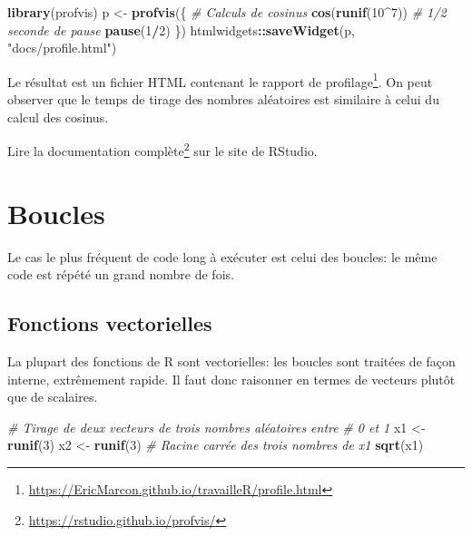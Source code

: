 \documentclass[
  12pt,
  french,
  a4paper,
  extrafontsizes,onecolumn,openright
  ]{memoir}
\newenvironment{Shaded}{\begin{snugshade}}{\end{snugshade}}
\newcommand{\CommentTok}[1]{\textcolor[rgb]{0.56,0.35,0.01}{\textit{#1}}}
\newcommand{\DecValTok}[1]{\textcolor[rgb]{0.00,0.00,0.81}{#1}}
\newcommand{\KeywordTok}[1]{\textcolor[rgb]{0.13,0.29,0.53}{\textbf{#1}}}
\newcommand{\NormalTok}[1]{#1}
\newcommand{\OperatorTok}[1]{\textcolor[rgb]{0.81,0.36,0.00}{\textbf{#1}}}
\newcommand{\StringTok}[1]{\textcolor[rgb]{0.31,0.60,0.02}{#1}}
\begin{document}
\scriptsize

\begin{Shaded}
\begin{Highlighting}[]
\KeywordTok{library}\NormalTok{(profvis)}
\NormalTok{p <-}\StringTok{ }\KeywordTok{profvis}\NormalTok{(\{}
    \CommentTok{# Calculs de cosinus}
    \KeywordTok{cos}\NormalTok{(}\KeywordTok{runif}\NormalTok{(}\DecValTok{10}\OperatorTok{^}\DecValTok{7}\NormalTok{))}
    \CommentTok{# 1/2 seconde de pause}
    \KeywordTok{pause}\NormalTok{(}\DecValTok{1}\OperatorTok{/}\DecValTok{2}\NormalTok{)}
\NormalTok{\})}
\NormalTok{htmlwidgets}\OperatorTok{::}\KeywordTok{saveWidget}\NormalTok{(p, }\StringTok{"docs/profile.html"}\NormalTok{)}
\end{Highlighting}
\end{Shaded}

\normalsize

Le résultat est un fichier HTML contenant le rapport de profilage\footnote{\url{https://EricMarcon.github.io/travailleR/profile.html}}.
On peut observer que le temps de tirage des nombres aléatoires est similaire à celui du calcul des cosinus.

Lire la documentation complète\footnote{\url{https://rstudio.github.io/profvis/}} sur le site de RStudio.

\hypertarget{boucles}{%
\section{Boucles}\label{boucles}}

Le cas le plus fréquent de code long à exécuter est celui des boucles: le même code est répété un grand nombre de fois.

\hypertarget{fonctions-vectorielles}{%
\subsection{Fonctions vectorielles}\label{fonctions-vectorielles}}

La plupart des fonctions de R sont vectorielles: les boucles sont traitées de façon interne, extrêmement rapide.
Il faut donc raisonner en termes de vecteurs plutôt que de scalaires.

\scriptsize

\begin{Shaded}
\begin{Highlighting}[]
\CommentTok{# Tirage de deux vecteurs de trois nombres aléatoires entre}
\CommentTok{# 0 et 1}
\NormalTok{x1 <-}\StringTok{ }\KeywordTok{runif}\NormalTok{(}\DecValTok{3}\NormalTok{)}
\NormalTok{x2 <-}\StringTok{ }\KeywordTok{runif}\NormalTok{(}\DecValTok{3}\NormalTok{)}
\CommentTok{# Racine carrée des trois nombres de x1}
\KeywordTok{sqrt}\NormalTok{(x1)}
\end{Highlighting}
\end{Shaded}
\end{document}
